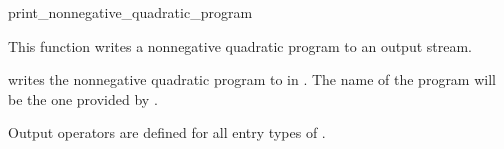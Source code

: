 \begin{ccRefFunction}{print_nonnegative_quadratic_program}


This function writes a nonnegative quadratic program to an output stream.

{writes the nonnegative quadratic program  to  in 
. The name of the program will be the one provided 
by .}

Output operators are defined for all entry types of .

\end{ccRefFunction}
